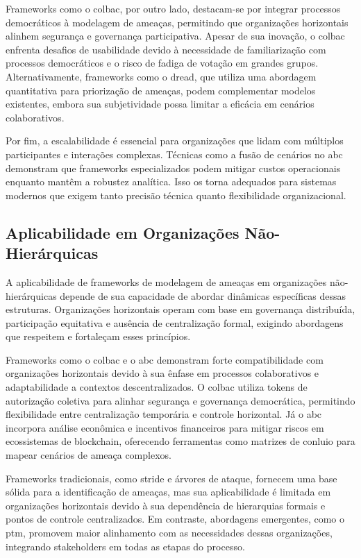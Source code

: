 Frameworks como o \gls{colbac}, por outro lado, destacam-se por integrar
processos democráticos à modelagem de ameaças, permitindo que
organizações horizontais alinhem segurança e governança participativa.
Apesar de sua inovação, o \gls{colbac} enfrenta desafios de usabilidade
devido à necessidade de familiarização com processos democráticos e o
risco de fadiga de votação em grandes grupos. Alternativamente,
frameworks como o \gls{dread}, que utiliza uma abordagem quantitativa para
priorização de ameaças, podem complementar modelos existentes, embora
sua subjetividade possa limitar a eficácia em cenários colaborativos.

Por fim, a escalabilidade é essencial para organizações que lidam com
múltiplos participantes e interações complexas. Técnicas como a fusão
de cenários no \gls{abc} demonstram que frameworks especializados
podem mitigar custos operacionais enquanto mantêm a robustez
analítica. Isso os torna adequados para sistemas modernos que exigem
tanto precisão técnica quanto flexibilidade organizacional.

\subsection{Aplicabilidade em Organizações Não-Hierárquicas}
\label{subsec:applicability_non_hierarchical}

A aplicabilidade de frameworks de modelagem de ameaças em organizações
não-hierárquicas depende de sua capacidade de abordar dinâmicas
específicas dessas estruturas. Organizações horizontais operam com
base em governança distribuída, participação equitativa e ausência de 
centralização formal, exigindo abordagens que respeitem e fortaleçam
esses princípios.

Frameworks como o \gls{colbac} e o \gls{abc} demonstram forte
compatibilidade com organizações horizontais devido à sua ênfase em
processos colaborativos e adaptabilidade a contextos descentralizados.
O  \gls{colbac} utiliza tokens de autorização coletiva para alinhar segurança
e governança democrática, permitindo flexibilidade entre centralização
temporária e controle horizontal. Já o \gls{abc} incorpora análise
econômica e incentivos financeiros para mitigar riscos em ecossistemas
de blockchain, oferecendo ferramentas como matrizes de conluio para
mapear cenários de ameaça complexos.

Frameworks tradicionais, como \gls{stride} e árvores de ataque, fornecem uma
base sólida para a identificação de ameaças, mas sua aplicabilidade é
limitada em organizações horizontais devido à sua dependência de
hierarquias formais e pontos de controle centralizados. Em contraste,
abordagens emergentes, como o \gls{ptm},
promovem maior alinhamento com as necessidades dessas organizações,
integrando stakeholders em todas as etapas do processo.

